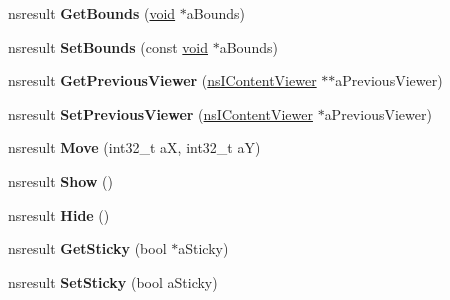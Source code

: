 \begin{DoxyCompactItemize}
\item 
\mbox{\label{interfacens_i_content_viewer_ad7b58d88fcfcde7a001e4e1d19a036c1}} 
nsresult {\bfseries Get\+Bounds} (\hyperlink{interfacevoid}{void} $\ast$a\+Bounds)
\item 
\mbox{\label{interfacens_i_content_viewer_a1e6adbb4778a625f4530785e8a70a9cf}} 
nsresult {\bfseries Set\+Bounds} (const \hyperlink{interfacevoid}{void} $\ast$a\+Bounds)
\item 
\mbox{\label{interfacens_i_content_viewer_a7cd36291e6297e6355bfd21c12951668}} 
nsresult {\bfseries Get\+Previous\+Viewer} (\hyperlink{interfacens_i_content_viewer}{ns\+I\+Content\+Viewer} $\ast$$\ast$a\+Previous\+Viewer)
\item 
\mbox{\label{interfacens_i_content_viewer_a2b6d17e1a84f120edec8165553b77514}} 
nsresult {\bfseries Set\+Previous\+Viewer} (\hyperlink{interfacens_i_content_viewer}{ns\+I\+Content\+Viewer} $\ast$a\+Previous\+Viewer)
\item 
\mbox{\label{interfacens_i_content_viewer_a1ea05a19190fc5823676f08cc08c06f9}} 
nsresult {\bfseries Move} (int32\+\_\+t aX, int32\+\_\+t aY)
\item 
\mbox{\label{interfacens_i_content_viewer_aaa025ba14207755a37feafde48f2c5c4}} 
nsresult {\bfseries Show} ()
\item 
\mbox{\label{interfacens_i_content_viewer_aa48f1fa242d2225c3b1a662c5966a0b0}} 
nsresult {\bfseries Hide} ()
\item 
\mbox{\label{interfacens_i_content_viewer_a1d8801b6ca354eabaa5bae0caece72be}} 
nsresult {\bfseries Get\+Sticky} (bool $\ast$a\+Sticky)
\item 
\mbox{\label{interfacens_i_content_viewer_a4f911e57f5911919b050dcccddfbd825}} 
nsresult {\bfseries Set\+Sticky} (bool a\+Sticky)
\item 
\mbox{\label{interfacens_i_content_viewer_a4f6e413f862510393f03ca84bd4eb68b}} 
$$
\end{DoxyCompactItemize}
